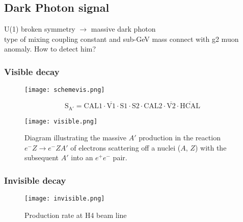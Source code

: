 \subsection{Dark Photon signal}
U(1) broken symmetry $\longrightarrow$ massive dark photon\\
type of mixing
coupling constant and sub-GeV mass connect with g2 muon anomaly.
How to detect him?
\subsubsection{Visible decay}


\begin{figure}[ht]
	\hspace*{\fill}
	\centering
	\texttt{[image: schemevis.png]}
	\hspace*{\fill}
	\caption{}
	\label{fig:schemevis}
\end{figure}

\begin{equation}
\mathrm{S_{A'} = CAL1 \cdot \overline{V1}\cdot S1\cdot S2\cdot CAL2\cdot \overline{V2}\cdot\overline{HCAL}}
\end{equation}

\begin{figure}[ht]
	\hspace*{\fill}
	\centering
	\texttt{[image: visible.png]}
	\hspace*{\fill}
	\caption{Diagram illustrating the massive $A'$ production in the reaction $e^-Z\rightarrow e^-ZA'$ of electrons
	scattering off a nuclei ($A$, $Z$) with the subsequent $A'$ into an $e^+e^-$ pair.}\label{fig:vis}
\end{figure}


\subsubsection{Invisible decay}
\begin{figure}[ht]
	\hspace*{\fill}
	\centering
	\texttt{[image: invisible.png]}
	\hspace*{\fill}
	\caption{Production rate at H4 beam line}\label{fig:inv}
\end{figure}


